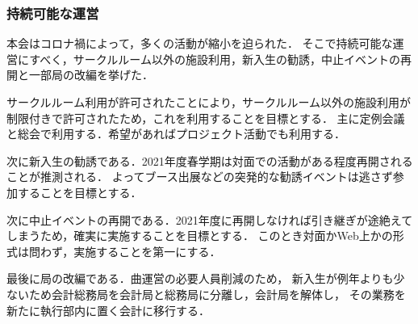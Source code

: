 \subsubsection{持続可能な運営}
本会はコロナ禍によって，多くの活動が縮小を迫られた．
そこで持続可能な運営にすべく，サークルルーム以外の施設利用，新入生の勧誘，中止イベントの再開と一部局の改編を挙げた．

サークルルーム利用が許可されたことにより，サークルルーム以外の施設利用が制限付きで許可されたため，これを利用することを目標とする．
主に定例会議と総会で利用する．希望があればプロジェクト活動でも利用する．

次に新入生の勧誘である．2021年度春学期は対面での活動がある程度再開されることが推測される．
よってブース出展などの突発的な勧誘イベントは逃さず参加することを目標とする．

次に中止イベントの再開である．2021年度に再開しなければ引き継ぎが途絶えてしまうため，確実に実施することを目標とする．
このとき対面かWeb上かの形式は問わず，実施することを第一にする．

最後に局の改編である．曲運営の必要人員削減のため，
新入生が例年よりも少ないため会計総務局を会計局と総務局に分離し，会計局を解体し，
その業務を新たに執行部内に置く会計に移行する．
